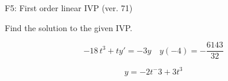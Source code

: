 \begin{exercise}
  \begin{exerciseTitle}F5: First order linear IVP (ver. 71)\end{exerciseTitle}
  \begin{exerciseStatement}
    
Find the solution to the given IVP.

    
\[-18 \, t^{3} +ty'= -3 y \hspace{1em} y( -4 ) = -\frac{6143}{32}\]

  \end{exerciseStatement}
  \begin{exerciseAnswer}
    
\[y= -2 t^ -3 +3 t^{3}\]

  \end{exerciseAnswer}
\end{exercise}